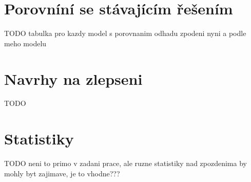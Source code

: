 \chapter{Porovníní se stávajícím řešením}

TODO tabulka pro kazdy model s porovnanim odhadu zpodeni nyni a podle meho modelu


\chapter{Navrhy na zlepseni} TODO

\chapter{Statistiky} TODO neni to primo v zadani prace, ale ruzne statistiky nad zpozdenima by mohly byt zajimave, je to vhodne???
